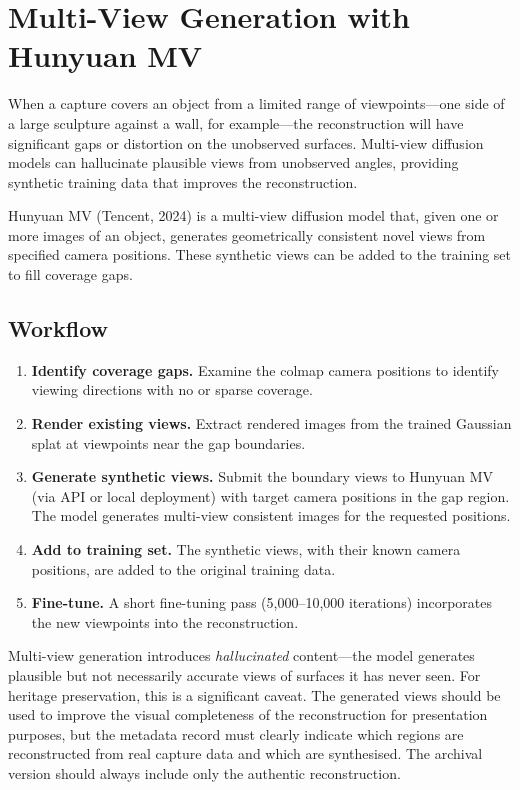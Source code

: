 \section{Multi-View Generation with Hunyuan MV}
\label{sec:adv-multiview}

When a capture covers an object from a limited range of viewpoints---one side of a large sculpture against a wall, for example---the reconstruction will have significant gaps or distortion on the unobserved surfaces. Multi-view diffusion models can hallucinate plausible views from unobserved angles, providing synthetic training data that improves the reconstruction.

Hunyuan MV (Tencent, 2024) is a multi-view diffusion model that, given one or more images of an object, generates geometrically consistent novel views from specified camera positions. These synthetic views can be added to the training set to fill coverage gaps.

\subsection{Workflow}

\begin{enumerate}
  \item \textbf{Identify coverage gaps.} Examine the \acrshort{colmap} camera positions to identify viewing directions with no or sparse coverage.
  \item \textbf{Render existing views.} Extract rendered images from the trained Gaussian splat at viewpoints near the gap boundaries.
  \item \textbf{Generate synthetic views.} Submit the boundary views to Hunyuan MV (via API or local deployment) with target camera positions in the gap region. The model generates multi-view consistent images for the requested positions.
  \item \textbf{Add to training set.} The synthetic views, with their known camera positions, are added to the original training data.
  \item \textbf{Fine-tune.} A short fine-tuning pass (5,000--10,000 iterations) incorporates the new viewpoints into the reconstruction.
\end{enumerate}

\begin{technote}
Multi-view generation introduces \emph{hallucinated} content---the model generates plausible but not necessarily accurate views of surfaces it has never seen. For heritage preservation, this is a significant caveat. The generated views should be used to improve the visual completeness of the reconstruction for presentation purposes, but the metadata record must clearly indicate which regions are reconstructed from real capture data and which are synthesised. The archival version should always include only the authentic reconstruction.
\end{technote}

